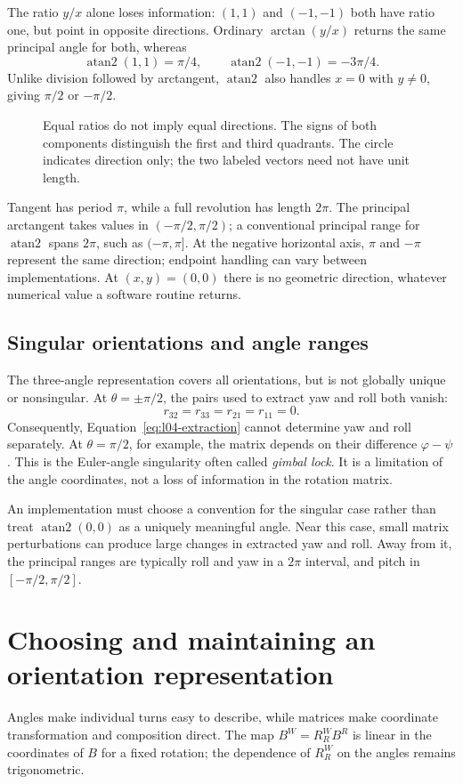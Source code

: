 The ratio $y/x$ alone loses information: $(1,1)$ and $(-1,-1)$ both have ratio
one, but point in opposite directions. Ordinary $\arctan(y/x)$ returns the
same principal angle for both, whereas
\[
 \operatorname{atan2}(1,1)=\pi/4,\qquad
 \operatorname{atan2}(-1,-1)=-3\pi/4.
\]
Unlike division followed by arctangent, $\operatorname{atan2}$ also handles
$x=0$ with $y\ne0$, giving $\pi/2$ or $-\pi/2$.

\begin{figure}[htbp]
\centering
\caption{Equal ratios do not imply equal directions. The signs of both
components distinguish the first and third quadrants. The circle indicates
direction only; the two labeled vectors need not have unit length.}
\label{fig:l04-atan2}
\end{figure}

Tangent has period $\pi$, while a full revolution has length $2\pi$.
The principal arctangent takes values in $(-\pi/2,\pi/2)$; a conventional
principal range for $\operatorname{atan2}$ spans $2\pi$, such as $(-\pi,\pi]$.
At the negative horizontal axis, $\pi$ and $-\pi$ represent the same direction;
endpoint handling can vary between implementations. At $(x,y)=(0,0)$ there is
no geometric direction, whatever numerical value a software routine returns.

\subsection{Singular orientations and angle ranges}
The three-angle representation covers all orientations, but is not globally
unique or nonsingular. At $\theta=\pm\pi/2$, the pairs used to extract yaw
and roll both vanish:
\[
 r_{32}=r_{33}=r_{21}=r_{11}=0.
\]
Consequently, Equation~\eqref{eq:l04-extraction} cannot determine yaw and roll
separately. At $\theta=\pi/2$, for example, the matrix depends on their
difference $\varphi-\psi$. This is the Euler-angle singularity often called
\emph{gimbal lock}. It is a limitation of the angle coordinates, not a loss
of information in the rotation matrix.

An implementation must choose a convention for the singular case rather than
treat $\operatorname{atan2}(0,0)$ as a uniquely meaningful angle. Near this
case, small matrix perturbations can produce large changes in extracted yaw
and roll. Away from it, the principal ranges are typically roll and yaw in
a $2\pi$ interval, and pitch in $[-\pi/2,\pi/2]$.

\section{Choosing and maintaining an orientation representation}
Angles make individual turns easy to describe, while matrices make coordinate
transformation and composition direct. The map $B^W=R_R^W B^R$ is linear in
the coordinates of $B$ for a fixed rotation; the dependence of $R_R^W$ on the
angles remains trigonometric.

